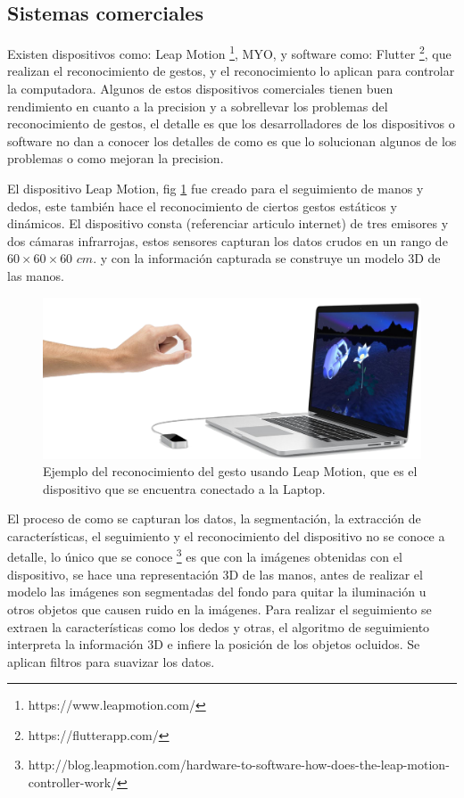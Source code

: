 \subsection{Sistemas comerciales}

Existen dispositivos como: Leap Motion \footnote{https://www.leapmotion.com/}, MYO, y software como: Flutter \footnote{https://flutterapp.com/}, que realizan el reconocimiento de gestos, y el reconocimiento lo aplican  para controlar la computadora. Algunos de estos dispositivos comerciales tienen  buen rendimiento en cuanto a la precision y a sobrellevar los problemas del reconocimiento de gestos, el detalle es que los desarrolladores de los dispositivos o software no dan a conocer los detalles de como es que lo solucionan algunos de los problemas o como mejoran la precision.
 
El dispositivo Leap Motion, fig \ref{fig:LeapMotion} fue creado para el seguimiento de manos y dedos, este también hace el reconocimiento de ciertos gestos estáticos y dinámicos. El dispositivo consta (referenciar articulo internet) de tres emisores y dos cámaras infrarrojas, estos sensores capturan los datos crudos en un rango de $60 \times 60 \times 60$ $cm.$ y con la información capturada se construye un modelo 3D de las manos. 

\begin{figure}[h!]
\begin{center}
\includegraphics[scale=.3]{./Figures/LeapMotion.png}
\end{center}
\caption{Ejemplo del reconocimiento del gesto usando Leap Motion, que es el dispositivo que se encuentra conectado a la Laptop.}
\label{fig:LeapMotion}
\end{figure}

El proceso de como se capturan los datos, la segmentación, la extracción de características, el seguimiento y el reconocimiento del dispositivo no se conoce a detalle, lo único que se conoce \footnote{http://blog.leapmotion.com/hardware-to-software-how-does-the-leap-motion-controller-work/} es que con la imágenes obtenidas con el dispositivo, se hace una representación 3D de las manos, antes de realizar el modelo las imágenes son segmentadas del fondo para quitar la iluminación u otros objetos que causen ruido en la imágenes.
Para realizar el seguimiento se extraen la características como los dedos y otras, el algoritmo de seguimiento interpreta la información 3D e infiere la posición de los objetos ocluidos. Se aplican filtros para suavizar los datos. 


